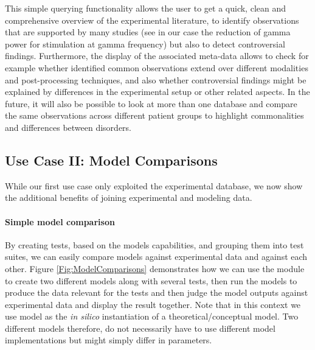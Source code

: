 \documentclass[a4paper,10pt]{article}
\begin{document}
This simple querying functionality allows the user to get a quick, clean and comprehensive overview of the experimental literature, to identify observations that are supported by many studies (see in our case the reduction of
gamma power for stimulation at gamma frequency) but also to detect controversial findings. Furthermore, the display of the associated meta-data allows to check for example whether identified common observations extend over
different modalities and post-processing techniques, and also whether controversial findings might be explained by differences in the experimental setup or other related aspects. In the future, it will also be possible 
to look at more than one database and compare the same observations across different patient groups to highlight commonalities and differences between disorders.


\subsection{Use Case II: Model Comparisons}

While our first use case only exploited the experimental database, we now show the additional benefits of joining experimental and modeling data. 

\paragraph{Simple model comparison}
By creating tests, based on the models capabilities, and grouping 
them into test suites, we can easily compare models against experimental data and against each other. Figure \ref{Fig:ModelComparisons} demonstrates how we can use the module to create two different models along with
several tests, then run the models to produce the data relevant for the tests and then judge the model outputs against experimental data and  display the result together. Note that in this context
we use model as the \textit{in silico} instantiation of a theoretical/conceptual model. Two different models therefore, do not necessarily have to use different model implementations but might simply differ in parameters.
\end{document}
